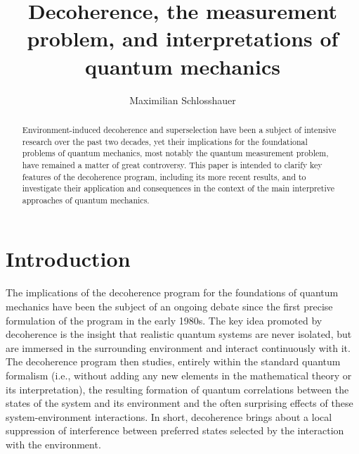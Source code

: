 \documentclass[twocolumn,rmp,aps,amsmath,amsfonts,noshowkeys,noshowpacs]{revtex4}
\begin{document}
\makeatletter
{}
\renewcommand{\theequation}{\@arabic\c@section.\@arabic\c@equation}
\makeatother

\title{Decoherence, the measurement problem, and interpretations of
  quantum mechanics}

\author{Maximilian Schlosshauer} 




\begin{abstract}
  Environment-induced decoherence and superselection have been a
  subject of intensive research over the past two decades, yet their
  implications for the foundational problems of quantum mechanics,
  most notably the quantum measurement problem, have remained a matter
  of great controversy. This paper is intended to clarify key features
  of the decoherence program, including its more recent results, and
  to investigate their application and consequences in the context of
  the main interpretive approaches of quantum mechanics.
\end{abstract}



\maketitle

\tableofcontents 


\section{Introduction}

The implications of the decoherence program for the foundations of
quantum mechanics have been the subject of an ongoing debate since the
first precise formulation of the program in the early 1980s. The key
idea promoted by decoherence is the insight that realistic quantum
systems are never isolated, but are immersed in the surrounding
environment and interact continuously with it.  The decoherence
program then studies, entirely within the standard quantum formalism
(i.e., without adding any new elements in the mathematical theory or
its interpretation), the resulting formation of quantum correlations
between the states of the system and its environment and the often
surprising effects of these system-environment interactions. In short,
decoherence brings about a local suppression of interference between
preferred states selected by the interaction with the environment.
\end{document}
